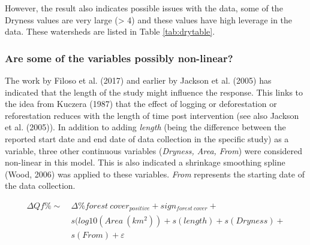 \documentclass[]{elsarticle} %
\begin{document}
However, the result also indicates possible issues with the data, some of the Dryness values are very large (\textgreater{} 4) and these values have high leverage in the data. These watersheds are listed in Table \ref{tab:drytable}.

\hypertarget{are-some-of-the-variables-possibly-non-linear}{%
\subsubsection{Are some of the variables possibly non-linear?}\label{are-some-of-the-variables-possibly-non-linear}}

The work by Filoso et al. (2017) and earlier by Jackson et al. (2005) has indicated that the length of the study might influence the response. This links to the idea from Kuczera (1987) that the effect of logging or deforestation or reforestation reduces with the length of time post intervention (see also Jackson et al. (2005)). In addition to adding \emph{length} (being the difference between the reported start date and end date of data collection in the specific study) as a variable, three other continuous variables (\emph{Dryness, Area, From}) were considered non-linear in this model. This is also indicated a shrinkage smoothing spline (Wood, 2006) was applied to these variables. \emph{From} represents the starting date of the data collection.

\[\tag{5}
\begin{aligned}
\Delta Qf \% \sim ~ &\Delta \% forest~cover_{positive} + sign_{forest~cover} + \\ & s(log10(Area ~(km^2)) + s(length) + s(Dryness) + \\ & s(From) + \varepsilon
\end{aligned}\]
\end{document}
